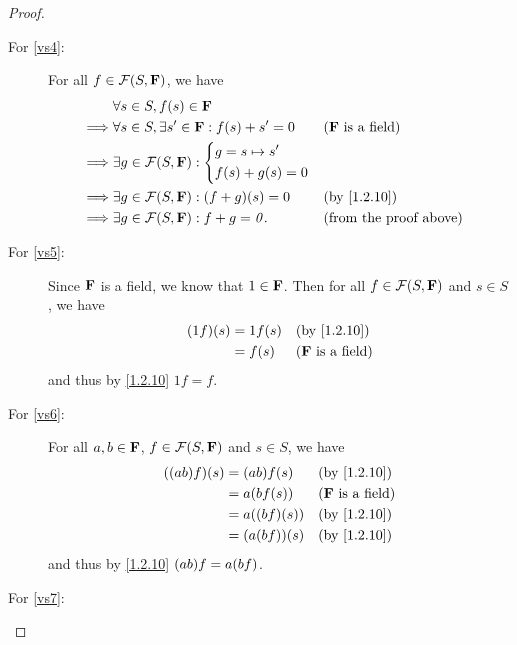 \begin{proof}
\begin{description}
        \item[For \ref{vs4}:]
            For all \(f \in \FS\), we have
            \begin{align*}
                         & \forall s \in S, f\p{s} \in \F                                                          \\
                \implies & \forall s \in S, \exists s' \in \F : f\p{s} + s' = 0 &  & \text{(\(\F\) is a field)}    \\
                \implies & \exists g \in \FS : \begin{dcases}
                    g = s \mapsto s' \\
                    f\p{s} + g\p{s} = 0
                \end{dcases}                                          \\
                \implies & \exists g \in \FS : \p{f + g}\p{s} = 0               &  & \text{(by \cref{1.2.10})}     \\
                \implies & \exists g \in \FS : f + g = \zv.                     &  & \text{(from the proof above)}
            \end{align*}
        \item[For \ref{vs5}:]
            Since \(\mathbf{F}\) is a field, we know that \(1 \in \mathbf{F}\).
            Then for all \(f \in \FS\) and \(s \in S\), we have
            \begin{align*}
                \p{1f}\p{s} & = 1f\p{s} &  & \text{(by \cref{1.2.10})}  \\
                            & = f\p{s}  &  & \text{(\(\F\) is a field)}
            \end{align*}
            and thus by \cref{1.2.10} \(1f = f\).
        \item[For \ref{vs6}:]
            For all \(a, b \in \mathbf{F}\), \(f \in \FS\) and \(s \in S\), we have
            \begin{align*}
                \p{\p{ab} f}\p{s} & = \p{ab} f\p{s}     &  & \text{(by \cref{1.2.10})}  \\
                                  & = a \p{b f\p{s}}    &  & \text{(\(\F\) is a field)} \\
                                  & = a \p{\p{bf}\p{s}} &  & \text{(by \cref{1.2.10})}  \\
                                  & = \p{a \p{bf}}\p{s} &  & \text{(by \cref{1.2.10})}
            \end{align*}
            and thus by \cref{1.2.10} \(\p{ab} f = a \p{bf}\).
        \item[For \ref{vs7}:]

\end{description}
\end{proof}
